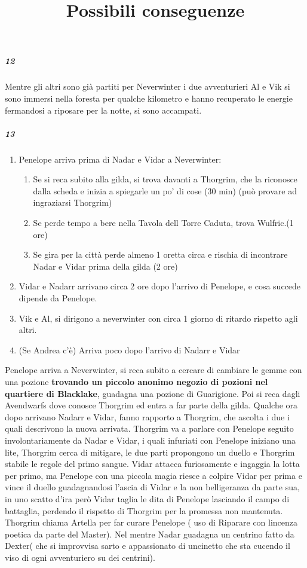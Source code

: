 \documentclass{article}
\begin{document}
\subparagraph{12}
Mentre gli altri sono già partiti per Neverwinter i due avventurieri Al e Vik si sono immersi nella foresta per qualche kilometro e hanno recuperato le energie fermandosi a riposare per la notte, si sono accampati. 
\subparagraph{13} 
\title{Possibili conseguenze}
   \begin{enumerate}
       \item  Penelope arriva prima di Nadar e Vidar a Neverwinter: 
        \begin{enumerate}
            \item Se si reca subito alla gilda, si trova davanti a Thorgrim, che la riconosce dalla scheda e inizia a spiegarle un po' di cose (30 min) (può provare ad ingraziarsi Thorgrim)
            \item Se perde tempo a bere nella Tavola dell Torre Caduta, trova Wulfric.(1 ore) 
            \item Se gira per la città perde almeno 1 oretta circa e rischia di incontrare Nadar e Vidar prima della gilda (2 ore)
        \end{enumerate}
        \item  Vidar e Nadarr arrivano      circa 2 ore dopo l'arrivo di Penelope, e cosa succede dipende da Penelope.
        \item Vik e Al, si dirigono a neverwinter con circa 1 giorno di ritardo rispetto agli altri.
        \item (Se Andrea c'è) Arriva poco dopo l'arrivo di Nadarr e Vidar
   \end{enumerate}
Penelope arriva a Neverwinter, si reca subito a cercare di cambiare le gemme con una pozione \textbf{trovando un piccolo anonimo negozio di pozioni nel quartiere di Blacklake}, guadagna una pozione di Guarigione. Poi si reca dagli Avendwarfs dove conosce Thorgrim ed entra a far parte della gilda. Qualche ora dopo arrivano Nadarr e Vidar, fanno rapporto a Thorgrim, che ascolta i due i quali descrivono la nuova arrivata. Thorgrim va a parlare con Penelope seguito involontariamente da Nadar e Vidar, i quali infuriati con Penelope iniziano una lite, Thorgrim cerca di mitigare, le due parti propongono un duello e Thorgrim stabile le regole del primo sangue. Vidar attacca furiosamente e ingaggia la lotta per primo, ma Penelope con una piccola magia riesce a colpire Vidar per prima e vince il duello guadagnandosi l'ascia di Vidar e la non belligeranza da parte sua, in uno scatto d'ira però Vidar taglia le dita di Penelope lasciando il campo di battaglia, perdendo il rispetto di Thorgrim per la promessa non mantenuta. Thorgrim chiama Artella per far curare Penelope ( uso di Riparare con lincenza poetica da parte del Master). Nel mentre Nadar guadagna un centrino fatto da Dexter( che si improvvisa sarto e appassionato di uncinetto che sta cucendo il viso di ogni avventuriero su dei centrini).
\end{document}
